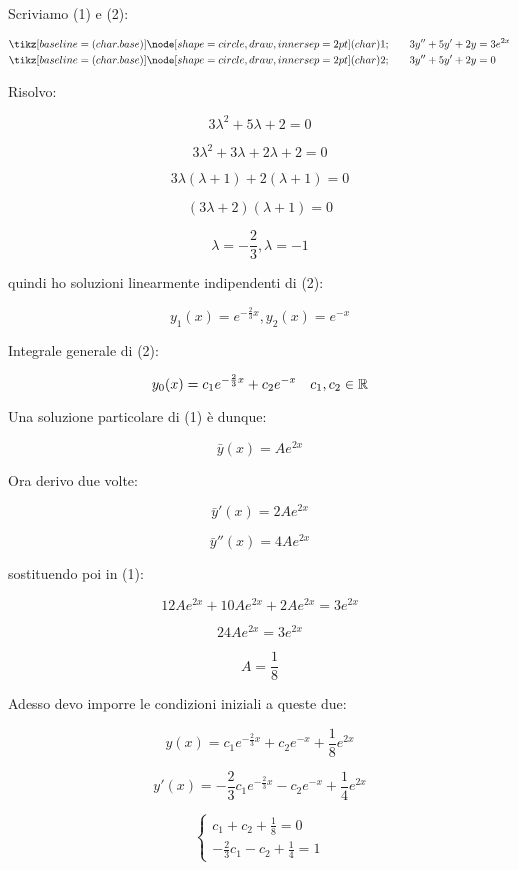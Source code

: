 Scriviamo (1) e (2):

\begin{align*}
    \circled{1} & \qquad 3y''+5y'+2y = 3 e^{2x} \\
    \circled{2} & \qquad 3y''+5y'+2y = 0
\end{align*}

Risolvo:

\[
    3 \lambda ^{2} + 5 \lambda + 2 = 0
\]

\[
    3 \lambda^{2} + 3 \lambda + 2 \lambda + 2 =0
\]

\[
    3 \lambda ( \lambda+1) + 2( \lambda + 1) =0
\]

\[
    (3 \lambda +2 ) ( \lambda +1 ) =0
\]

\[
    \lambda= -\frac{2}{3}, \lambda=-1
\]

quindi ho soluzioni linearmente indipendenti di (2):

\[
    y_1(x) = e ^{-\frac{2}{3}x}, y_2(x) = e ^{-x}
\]

Integrale generale di (2):

\[
    y_0(x) = c_1 e^{-\frac{2}{3}x} + c_2 e ^{-x} \quad c_1,c_2 \in \mathbb{R}
\]


Una soluzione particolare di (1) è dunque:

\[
    \bar{y} (x) = A e ^{2x}
\]

Ora derivo due volte:

\[
    \bar{y} '(x) = 2A e ^{2x}
\]

\[
    \bar{y} ''(x) = 4A e ^{2x}
\]

sostituendo poi in (1):

\[
    12Ae ^{2x} + 10 A e ^{2x} + 2 A e ^{2x} = 3 e^{2x}
\]

\[
    24A e ^{2x} = 3 e ^{2x}
\]

\[
    A = \frac{1}{8}
\]

Adesso devo imporre le condizioni iniziali a queste due:

\[
    y(x) = c_1 e ^{-\frac{2}{3}x} + c_2 e ^{-x}+ \frac{1}{8}e ^{2x}
\]

\[
    y'(x) = -\frac{2}{3}c_1 e ^{-\frac{2}{3}x} - c_2 e ^{-x}+ \frac{1}{4} e ^{2x}
\]


\begin{equation*}
    \begin{cases*}
        c_1+c_2+\frac{1}{8}=0 \\
        -\frac{2}{3}c_1-c_2+\frac{1}{4}=1
    \end{cases*}
\end{equation*}

